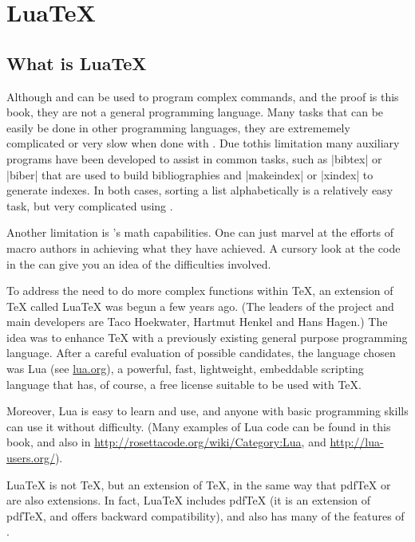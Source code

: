 \MakePercentComment
\chapter{LuaTeX}

\section{What is LuaTeX}

Although \tex and \latex can be used to program complex commands, and the proof is this book, they are not a general programming language. Many tasks that can be easily be done
in other programming languages, they are extrememely complicated or very slow when done with \tex. Due tothis limitation many auxiliary programs have been developed to assist in common tasks, such as |bibtex| or |biber| that are used to build bibliographies and |makeindex| or |xindex| to generate indexes. In both cases, sorting a list alphabetically is a relatively easy task, but very complicated using \tex.


Another limitation is \tex's math capabilities. One can just marvel at the efforts of \tex macro authors in achieving what they have achieved. A cursory look at the code in the  can give you an idea of the difficulties involved.

To address the need to do more complex functions within \TeX, an extension of \TeX{} called Lua\TeX{} was begun a few years ago.  
(The leaders of the project and main developers are Taco Hoekwater, Hartmut Henkel and Hans Hagen.) The idea was to enhance \TeX{} with a previously existing general purpose programming language. After a careful evaluation of possible candidates, the language chosen was Lua (see \href{http://www.lua.org/}{lua.org}), a powerful, fast, lightweight, embeddable scripting language that has,  of course, a free license suitable to be used with \TeX.

Moreover, Lua is easy to learn and use, and anyone with basic programming skills can use it without difficulty. (Many examples of Lua code can be found in this book, and also in \url{http://rosettacode.org/wiki/Category:Lua},
and \url{http://lua-users.org/}).

Lua\TeX{} is not \TeX{}, but an extension of \TeX{}, in the same way that pdf\TeX{} or \XeTeX{} are also extensions.
In fact, Lua\TeX{} includes pdf\TeX{} (it is an extension of pdf\TeX{}, and offers backward compatibility), 
and also has many of the features of \XeTeX.

